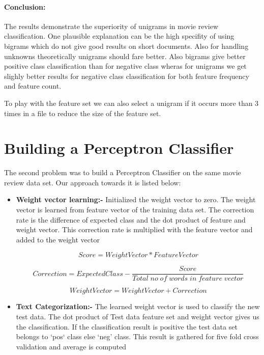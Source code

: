 \documentclass[paper=a4, fontsize=11pt]{scrartcl}
\numberwithin{equation}{section}		%
\numberwithin{figure}{section}			%
\numberwithin{table}{section}				%
\begin{document}
\paragraph{\bf Conclusion:}The results demonstrate the superiority of unigrams in movie review classification. One plausible explanation can be the  high specifity of using bigrams which do not give good results on short documents. Also for handling unknowns theoretically unigrams should fare better. Also bigrams give better positive class classification than for negative class wheras for unigrams we get slighly better results for negative class classification for both feature frequency and feature count.

To play with the feature set we can also select a unigram if it occurs more than 3 times in a file to reduce the size of the feature set. 


\section{Building a Perceptron Classifier}

The second problem was to build a Perceptron Classifier on the same movie review data set. Our approach towards it is listed below:
\begin {itemize}
	\item {\bf Weight vector learning:-} Initialized the weight vector to zero. The weight vector is learned from feature vector of the training data set. The correction rate is the difference of expected class and the dot product of feature and weight vector. This correction rate is multiplied with the feature vector and added to the weight vector

\begin{equation}
Score = WeightVector * FeatureVector
\end{equation}

\begin{equation}
Correction = ExpectedClass - \frac{Score}{Total\;no\;of\;words\;in\;feature\;vector}
\end{equation}

\begin{equation}
WeightVector =WeightVector + Correction
\end{equation}


	\item  {\bf Text Categorization:-} The learned weight vector is used to classify the new test data. The dot product of Test data feature set and weight vector gives us the classification. If the classification result is positive the test data set belongs to `pos` class else `neg' class. This result is gathered for five fold cross validation and average is computed    
    \end {itemize}
\end{document}
